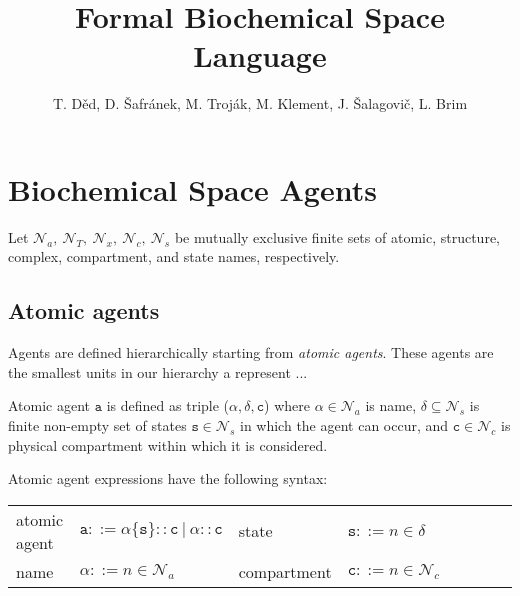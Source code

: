 \documentclass{entcs}
\renewcommand{\~}[0]{\texttildelow}
\newcommand{\choice}{|}
\begin{document}
\begin{frontmatter}
\title{Formal Biochemical Space Language}

\author{\normalsize
T. D\v{e}d, D. \v{S}afr\'anek, M. Troj\'ak, M. Klement, J. \v{S}alagovi\v{c}, L. Brim}
\address{Faculty of Informatics, Masaryk University\\
Brno, Czech Republic
}

\end{frontmatter}

\section{Biochemical Space Agents}

Let $\mathcal{N}_{a},~\mathcal{N}_{T},~\mathcal{N}_{x},~\mathcal{N}_{c},~\mathcal{N}_{s}$ be mutually exclusive finite sets of atomic, structure, complex, compartment, and state names, respectively. 

\subsection{Atomic agents}

Agents are defined hierarchically starting from \emph{atomic agents}. These agents are the smallest units in our hierarchy a represent ...

\begin{definition}
Atomic agent $\mathtt{a}$ is defined as triple ($\alpha, \delta, \mathtt{c}$) where $\alpha \in \mathcal{N}_{a}$ is name, $\delta \subseteq \mathcal{N}_{s}$ is finite non-empty set of states $\mathtt{s} \in \mathcal{N}_{s}$ in which the agent can occur, and $\mathtt{c} \in \mathcal{N}_{c}$ is physical compartment within which it is considered.
\end{definition}

Atomic agent expressions have the following syntax:

\begin{center}
{\small
\hspace*{-1cm}\begin{tabular}{ ll ll ll ll }
 atomic agent & $\mathtt{a} ::= \alpha\{\mathtt{s}\}::\mathtt{c}~\choice~\alpha::\mathtt{c}$ & state & $\mathtt{s} ::= n \in \delta$\\
 name & $\alpha ::= n \in \mathcal{N}_{a}$ & compartment & $\mathtt{c} ::= n \in \mathcal{N}_{c}$\\
\end{tabular}
}
\end{center}
\end{document}
